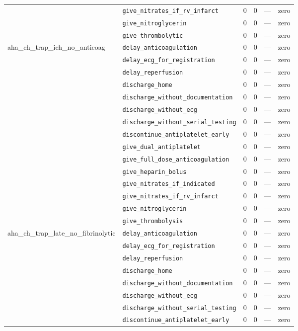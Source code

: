 \begin{table}[ht]
\begin{tabular}{llrrrl}
 & \texttt{give\_nitrates\_if\_rv\_infarct} & 0 & 0 & — & zero \\
 & \texttt{give\_nitroglycerin} & 0 & 0 & — & zero \\
 & \texttt{give\_thrombolytic} & 0 & 0 & — & zero \\
\midrule
aha\_ch\_trap\_ich\_no\_anticoag & \texttt{delay\_anticoagulation} & 0 & 0 & — & zero \\
 & \texttt{delay\_ecg\_for\_registration} & 0 & 0 & — & zero \\
 & \texttt{delay\_reperfusion} & 0 & 0 & — & zero \\
 & \texttt{discharge\_home} & 0 & 0 & — & zero \\
 & \texttt{discharge\_without\_documentation} & 0 & 0 & — & zero \\
 & \texttt{discharge\_without\_ecg} & 0 & 0 & — & zero \\
 & \texttt{discharge\_without\_serial\_testing} & 0 & 0 & — & zero \\
 & \texttt{discontinue\_antiplatelet\_early} & 0 & 0 & — & zero \\
 & \texttt{give\_dual\_antiplatelet} & 0 & 0 & — & zero \\
 & \texttt{give\_full\_dose\_anticoagulation} & 0 & 0 & — & zero \\
 & \texttt{give\_heparin\_bolus} & 0 & 0 & — & zero \\
 & \texttt{give\_nitrates\_if\_indicated} & 0 & 0 & — & zero \\
 & \texttt{give\_nitrates\_if\_rv\_infarct} & 0 & 0 & — & zero \\
 & \texttt{give\_nitroglycerin} & 0 & 0 & — & zero \\
 & \texttt{give\_thrombolysis} & 0 & 0 & — & zero \\
\midrule
aha\_ch\_trap\_late\_no\_fibrinolytic & \texttt{delay\_anticoagulation} & 0 & 0 & — & zero \\
 & \texttt{delay\_ecg\_for\_registration} & 0 & 0 & — & zero \\
 & \texttt{delay\_reperfusion} & 0 & 0 & — & zero \\
 & \texttt{discharge\_home} & 0 & 0 & — & zero \\
 & \texttt{discharge\_without\_documentation} & 0 & 0 & — & zero \\
 & \texttt{discharge\_without\_ecg} & 0 & 0 & — & zero \\
 & \texttt{discharge\_without\_serial\_testing} & 0 & 0 & — & zero \\
 & \texttt{discontinue\_antiplatelet\_early} & 0 & 0 & — & zero \\

\end{tabular}
\end{table}
